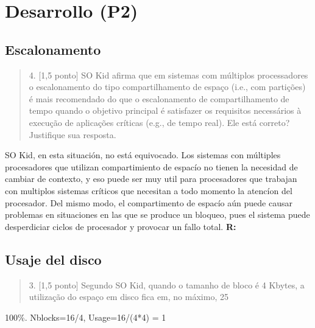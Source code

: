 \section{Desarrollo (P2)}


\subsection{Escalonamento}

\begin{quotation}
    4. [1,5 ponto] SO Kid afirma que em sistemas com múltiplos processadores o escalonamento do tipo compartilhamento de espaço (i.e., com partições) é mais recomendado do que o escalonamento de compartilhamento de tempo quando o objetivo principal é satisfazer os requisitos necessários à execução de aplicações críticas (e.g., de tempo real). Ele está correto? Justifique sua resposta.
\end{quotation}
SO Kid, en esta situación, no está equivocado. Los sistemas con múltiples procesadores
que utilizan compartimiento de espacío no tienen la necesidad de cambiar de contexto, y eso puede ser muy util para
procesadores que trabajan con multiplos sistemas críticos que necesitan a todo momento la atencíon del procesador.
Del mismo modo, el compartimento de espacío aún puede causar problemas en situaciones en las que se 
produce un bloqueo, pues el sistema puede desperdiciar ciclos de procesador y provocar
un fallo total.
\large{\textbf{R:}}

\subsection{Usaje del disco}
\begin{quotation}
    3. [1,5 ponto] Segundo SO Kid, quando o tamanho de bloco é 4 Kbytes, a utilização do espaço em disco fica em, no máximo, 25%
\end{quotation}
    100\%. Nblocks=16/4, Usage=16/(4*4) = 1